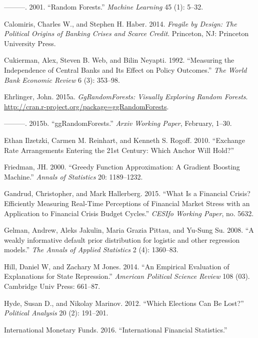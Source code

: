 \documentclass[]{article}
\begin{document}
\hypertarget{ref-Breiman2001}{}
---------. 2001. ``Random Forests.'' \emph{Machine Learning} 45 (1):
5--32.

\hypertarget{ref-calomirisHaber2014}{}
Calomiris, Charles W., and Stephen H. Haber. 2014. \emph{Fragile by
Design: The Political Origins of Banking Crises and Scarce Credit}.
Princeton, NJ: Princeton University Press.

\hypertarget{ref-Cukierman1992}{}
Cukierman, Alex, Steven B. Web, and Bilin Neyapti. 1992. ``Measuring the
Independence of Central Banks and Its Effect on Policy Outcomes.''
\emph{The World Bank Economic Review} 6 (3): 353--98.

\hypertarget{ref-r-ggRandomForests}{}
Ehrlinger, John. 2015a. \emph{GgRandomForests: Visually Exploring Random
Forests}. \url{http://cran.r-project.org/package=ggRandomForests}.

\hypertarget{ref-Ehrlinger2015}{}
---------. 2015b. ``ggRandomForests.'' \emph{Arxiv Working Paper},
February, 1--30.

\hypertarget{ref-ilzetzki2010}{}
Ethan Ilzetzki, Carmen M. Reinhart, and Kenneth S. Rogoff. 2010.
``Exchange Rate Arrangements Entering the 21st Century: Which Anchor
Will Hold?''

\hypertarget{ref-Friedman2000}{}
Friedman, JH. 2000. ``Greedy Function Approximation: A Gradient Boosting
Machine.'' \emph{Annals of Statistics} 20: 1189--1232.

\hypertarget{ref-GandrudHallbergFinStress}{}
Gandrud, Christopher, and Mark Hallerberg. 2015. ``What Is a Financial
Crisis? Efficiently Measuring Real-Time Perceptions of Financial Market
Stress with an Application to Financial Crisis Budget Cycles.''
\emph{CESIfo Working Paper}, no. 5632.

\hypertarget{ref-Gelman2008}{}
Gelman, Andrew, Aleks Jakulin, Maria Grazia Pittau, and Yu-Sung Su.
2008. ``A weakly informative default prior distribution for logistic and
other regression models.'' \emph{The Annals of Applied Statistics} 2
(4): 1360--83.

\hypertarget{ref-hill2014empirical}{}
Hill, Daniel W, and Zachary M Jones. 2014. ``An Empirical Evaluation of
Explanations for State Repression.'' \emph{American Political Science
Review} 108 (03). Cambridge Univ Press: 661--87.

\hypertarget{ref-hyde2012}{}
Hyde, Susan D., and Nikolay Marinov. 2012. ``Which Elections Can Be
Lost?'' \emph{Political Analysis} 20 (2): 191--201.

\hypertarget{ref-imfifs}{}
International Monetary Funds. 2016. ``International Financial
Statistics.''
\end{document}
